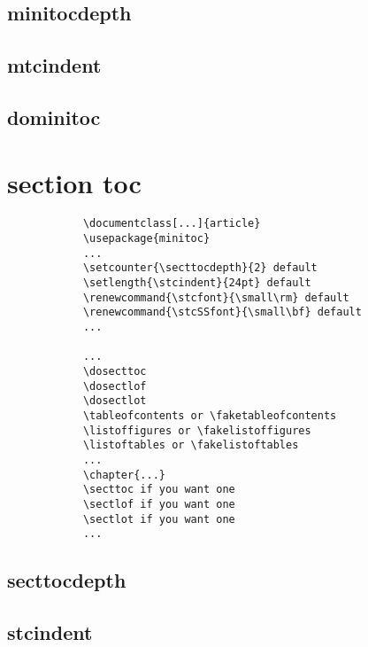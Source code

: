 		
		\subsection{minitocdepth}
		
		
		\subsection{mtcindent}
				
								
		\subsection{dominitoc}

				
		\newpage
	\section{section toc }
	
		\singlespace
		\setlength{\fboxsep}{12pt}
		\begin{boxedminipage}[c]{1.0\linewidth}
		\color{blue}
		\begin{verbatim}
			\documentclass[...]{article}
			\usepackage{minitoc}
			...
			\setcounter{\secttocdepth}{2} default
			\setlength{\stcindent}{24pt} default
			\renewcommand{\stcfont}{\small\rm} default
			\renewcommand{\stcSSfont}{\small\bf} default
			...
			
			...
			\dosecttoc
			\dosectlof
			\dosectlot
			\tableofcontents or \faketableofcontents
			\listoffigures or \fakelistoffigures
			\listoftables or \fakelistoftables
			...
			\chapter{...}
			\secttoc if you want one
			\sectlof if you want one
			\sectlot if you want one
			...
		\end{verbatim}
		\end{boxedminipage}
		\color{black}
		\doublespace
		

		\subsection{secttocdepth}
		
		
		\subsection{stcindent}


